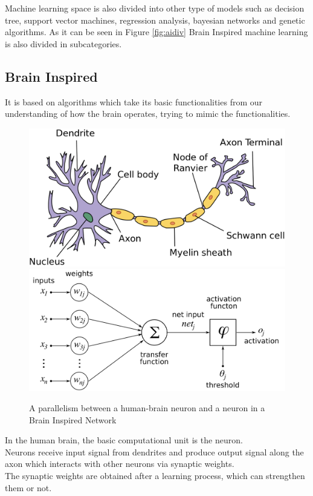 Machine learning space is also divided into other type of models such as decision tree, support vector machines, regression analysis, bayesian networks and genetic algorithms.
As it can be seen in Figure \ref{fig:aidiv} Brain Inspired machine learning is also divided in subcategories.
\subsection{Brain Inspired}
It is based on algorithms which take its basic functionalities from our understanding of how the brain operates, trying to mimic the functionalities.

\begin{figure}[H]
\centering
\captionsetup{justification=centering}
\includegraphics[scale=0.15]{./figure/human_neuron.png}\\

\includegraphics[scale=0.15]{./figure/nn_neuron.png}

\caption[Caption for LOF]{A parallelism between a human-brain neuron and a neuron in a Brain Inspired Network\protect\footnotemark}
\label{fig:neuron}
\end{figure}
In the human brain, the basic computational unit is the neuron.\\ Neurons receive input signal from dendrites and produce output signal along the axon which interacts with other neurons via synaptic weights.\\ The synaptic weights are obtained after a learning process, which can strengthen them or not.
